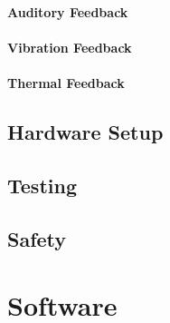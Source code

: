 \paragraph{Auditory Feedback}

\paragraph{Vibration Feedback}

\paragraph{Thermal Feedback}

\subsection{Hardware Setup}



\subsection{Testing}



\subsection{Safety}




\section{Software}
